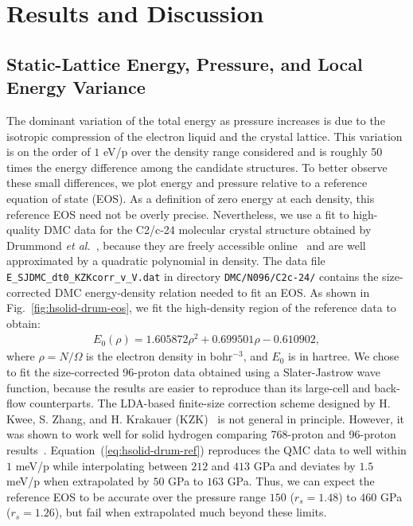 \section{Results and Discussion}
\label{sec:hsolid-results}

\subsection{Static-Lattice Energy, Pressure, and Local Energy Variance}

The dominant variation of the total energy as pressure increases is due to the isotropic compression of the electron liquid and the crystal lattice. This variation is on the order of $1$ eV/p over the density range considered and is roughly 50 times the energy difference among the candidate structures.
To better observe these small differences, we plot energy and pressure relative to a reference equation of state (EOS).
As a definition of zero energy at each density, this reference EOS need not be overly precise.
Nevertheless, we use a fit to high-quality DMC data for the C2/c-24 molecular crystal structure obtained by Drummond \textit{et al.}~\cite{Drummond2015}, because they are freely accessible online~\cite{drum-eos} and are well approximated by a quadratic polynomial in density.
The data file \verb|E_SJDMC_dt0_KZKcorr_v_V.dat| in directory \verb|DMC/N096/C2c-24/| contains the size-corrected DMC energy-density relation needed to fit an EOS.
As shown in Fig.~\ref{fig:hsolid-drum-eos}, we fit the high-density region of the reference data to obtain:
\begin{align}
E_0(\rho) = 1.605872\rho^2 + 0.699501\rho - 0.610902,
\label{eq:hsolid-drum-ref}
\end{align}
where $\rho=N/\Omega$ is the electron density in bohr$^{-3}$, and $E_0$ is in hartree.
We chose to fit the size-corrected 96-proton data obtained using a Slater-Jastrow wave function, because the results are easier to reproduce than its large-cell and back-flow counterparts.
The LDA-based finite-size correction scheme designed by H. Kwee, S. Zhang, and H. Krakauer (KZK)~\cite{Kwee2008} is not general in principle.
However, it was shown to work well for solid hydrogen comparing 768-proton and 96-proton results~\cite{Drummond2015}.
Equation~(\ref{eq:hsolid-drum-ref}) reproduces the QMC data to well within $1$ meV/p while interpolating between $212$ and $413$ GPa and deviates by $1.5$ meV/p when extrapolated by $50$ GPa to $163$ GPa.
Thus, we can expect the reference EOS to be accurate over the pressure range $150$ ($r_s=1.48$) to $460$ GPa ($r_s=1.26$), but fail when extrapolated much beyond these limits.

